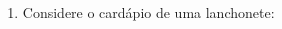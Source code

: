 \documentclass[a4paper,14pt]{article}
\begin{document}
\begin{multicols}{2}
\begin{enumerate}
\begin{enumerate}[a)]
    				\item 5,2 + 7,76 \\\\\\\\\\\\
    				\item 7,035 + 2,31 \\\\\\\\\\\\
    				\item 7,8 - 3,2 \\\\\\\\\\\\
    				\item 3,21 - 0,51 \\\\\\\\\\\\
    				\item 9,016 - 2,4 \\\\\\\\\\\\
    				\item 13,2 + 6,4 + 10,8 \\\\\\\\\\\\
    				\item 3,21 + 6,1 + 31,07 \\\\\\\\
    				\item 4,31 + 8,123 + 2,04 \\\\\\\\\\\\
    			\end{enumerate}
    			\item Considere o cardápio de uma lanchonete: \\\\

\end{enumerate}
\end{multicols}
\end{document}
